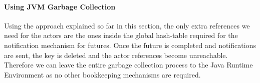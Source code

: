 \paragraph{Using JVM Garbage Collection}
Using the approach explained so far in this section, the only extra references we need for the actors are the ones inside the global hash-table required for the notification mechanism for futures. Once the future is completed and notifications are sent, the key is deleted and the actor references become unreachable. Therefore we can leave the entire garbage collection process to the Java Runtime Environment as no other bookkeeping mechanisms are required.





